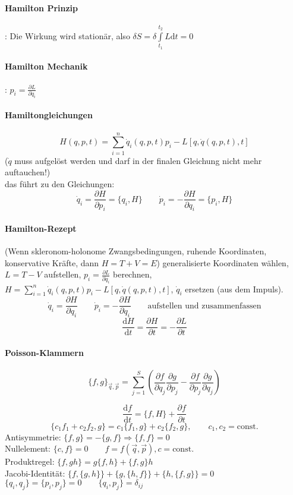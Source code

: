 \documentclass[a4paper, 11pt, fleqn]{article}
\renewcommand{\vec}{\overrightarrow}
\newcommand{\const}{\mathrm{const.}}
\newcommand{\md}{\mathrm{d}}
\newcommand{\pd}[2]{\frac{\partial #1}{\partial #2}}
\newcommand{\ad}[2]{\frac{\md #1}{\md #2}}
\begin{document}
\begin{multicols}{2}
\paragraph{Hamilton Prinzip}: Die Wirkung wird stationär, also $\delta S = \delta \int\limits_{t_1}^{t_2}L\md t = 0$

\paragraph{Hamilton Mechanik}: $p_i = \pd{L}{\dot q_i}$

\paragraph{Hamiltongleichungen}
\[H(q,p,t) = \sum\limits_{i=1}^n\dot q_i(q,p,t)p_i-L[q,\dot q(q,p,t),t]\]
($\dot q$ muss aufgelöst werden und darf in der finalen Gleichung nicht mehr auftauchen!)\\
das führt zu den Gleichungen:
\[\dot q_i = \pd{H}{p_i} = \{q_i, H\} \qquad \dot p_i = -\pd{H}{q_i} = \{p_i, H\}\]
\paragraph{Hamilton-Rezept}
(Wenn skleronom-holonome Zwangsbedingungen, ruhende Koordinaten, konservative Kräfte, dann $H=T+V=E$)
generalisierte Koordinaten wählen, $L = T - V$ aufstellen, $p_i = \pd{L}{\dot q_i}$ berechnen, $H=\sum\limits_{i=1}^n\dot q_i(q,p,t)p_i-L[q,\dot q(q,p,t),t]$, $\dot q_i$ ersetzen (aus dem Impuls).
\[\dot q_i = \pd{H}{q_i} \qquad \dot p_i = -\pd{H}{q_i} \qquad \text{aufstellen und zusammenfassen}\]
\[\ad{H}{t}=\pd{H}{t} =-\pd{L}{t}\]

\paragraph{Poisson-Klammern}
\[\{f,g\}_{\vec q, \vec p} = \sum\limits_{j=1}^S \left(\frac{\partial f}{\partial q_j}\frac{\partial g}{\partial p_j} - \frac{\partial f}{\partial p_j}\frac{\partial g}{\partial q_j} \right)\]

\[\ad{f}{t} = \{f,H\} + \pd{f}{t}\]
\[\{c_1f_1+c_2f_2,g\} = c_1\{f_1,g\} + c_2\{f_2,g\}, \qquad c_1,c_2=\const\]
Antisymmetrie: $\{f,g\} = -\{g,f\} \Rightarrow \{f,f\}=0$\\
Nullelement: $\{c,f\} = 0 \qquad f=f(\vec q, \vec p), c=\const$\\
Produktregel: $\{f,gh\} = g\{f,h\} + \{f,g\}h$\\
Jacobi-Identität: $\{f,\{g,h\}\} + \{g,\{h,f\}\} + \{h,\{f,g\}\} = 0$\\
$\{q_i,q_j\} = \{p_i,p_j\} = 0 \qquad \{q_i,p_j\} = \delta_{ij}$

\end{multicols}
\end{document}
